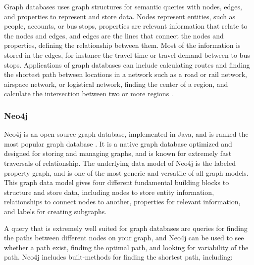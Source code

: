Graph databases uses graph structures for semantic queries with nodes, edges, and properties to represent and store data.
Nodes represent entities, such as people, accounts, or bus stops, properties are relevant information that relate to the nodes and edges, and edges are the lines that connect the nodes and properties, defining the relationship between them. Most of the information is stored in the edges, for instance the travel time or travel demand between to bus stops. 
Applications of graph databases can include calculating routes and finding the shortest path between locations in a network such as a road or rail network, airspace network, or logistical network, finding the center of a region, and calculate the intersection between two or more regions \citep[p.102]{robinson13}. 

\subsubsection{Neo4j}
Neo4j\citep{website:neo4j} is an open-source graph database, implemented in Java, and is ranked the most popular graph database \citep{website:graphdbranking}. It is a native graph database optimized and designed for storing and managing graphs, and is known for extremely fast traversals of relationship. The underlying data model of Neo4j is the labeled property graph, and is one of the most generic and versatile of all graph models\citep[p.73]{robinson13}. This graph data model gives four different fundamental building blocks to structure and store data, including nodes to store entity information, relationships to connect nodes to another, properties for relevant information, and labels for creating subgraphs. 

A query that is extremely well suited for graph databases are queries for finding the paths between different nodes on your graph, and Neo4j can be used to see whether a path exist, finding the optimal path, and looking for variability of the path\citep[p. 51]{bruggen14}. Neo4j includes built-methods for finding the shortest path, including:

